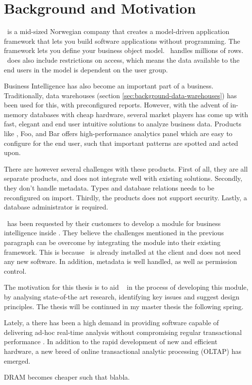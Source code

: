 \section{Background and Motivation}
\label{sec:background-and-motivation}

\genus~is a mid-sized Norwegian company that creates a model-driven application framework that lets you build software applications without programming. The framework lets you define your business object model. \genusSoftware~handles millions of rows. \genusSoftware~does also include restrictions on access, which means the data available to the end users in the model is dependent on the user group.

Business Intelligence has also become an important part of a business. Traditionally, data warehouses (section \ref{sec:background-data-warehouses}) has been used for this, with preconfigured reports. However, with the advent of in-memory databases with cheap hardware, several market players has come up with fast, elegant and end user intuitive solutions to analyze business data. Products like \qlikview, Foo, and Bar offers high-performance analytics panel which are easy to configure for the end user, such that important patterns are spotted and acted upon.

There are however several challenges with these products. First of all, they are all separate products, and does not integrate well with existing solutions. Secondly, they don't handle metadata. Types and database relations needs to be reconfigured on import. Thirdly, the products does not support security. Lastly, a database administrator is required.

\genus~has been requested by their customers to develop a module for business intelligence inside \genusSoftware . They believe the challenges mentioned in the previous paragraph can be overcome by integrating the module into their existing framework. This is because \genusSoftware~is already installed at the client and does not need any new software. In addition, metadata is well handled, as well as permission control. 

The motivation for this thesis is to aid \genus~ in the process of developing this module, by analysing state-of-the art research, identifying key issues and suggest design principles. The thesis will be continued in my master thesis the following spring.

Lately, a there has been a high demand in providing software capable of delivering ad-hoc real-time analysis without compromising regular transactional performance \cite{Mukherjee2015-ul}. In addition to the rapid development of new and efficient hardware, a new breed of online transactional analytic processing (OLTAP) has emerged.

DRAM becomes cheaper \cite{Manegold2000-st} such that blabla.
